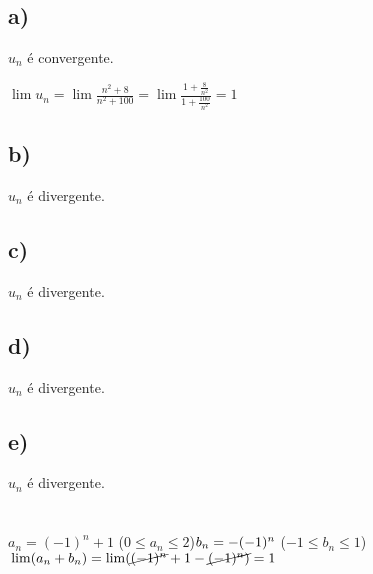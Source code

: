 \documentclass{article}
\begin{document}
\section{}
\subsection*{a)}
$u_n$ é convergente.

$\lim u_n = \lim \frac{n^2+8}{n^2+100} = \lim \frac{1 + \frac{8}{n^2}}{1+\frac{100}{n^2}} = 1$

\subsection*{b)}
$u_n$ é divergente.

\subsection*{c)}
$u_n$ é divergente.

\subsection*{d)}
$u_n$ é divergente.

\subsection*{e)}
$u_n$ é divergente.


\section{}
$a_n = (-1)^n + 1$\hspace{20pt} ($0 \leq a_n \leq 2$)$ \\
b_n = -(-1)^n $\hspace{30pt} ($ -1 \leq b_n \leq 1$)$ \\
\lim (a_n + b_n) = \lim (\cancel{(-1)^n} + 1 - \cancel{(-1)^n)} = 1$
\end{document}
